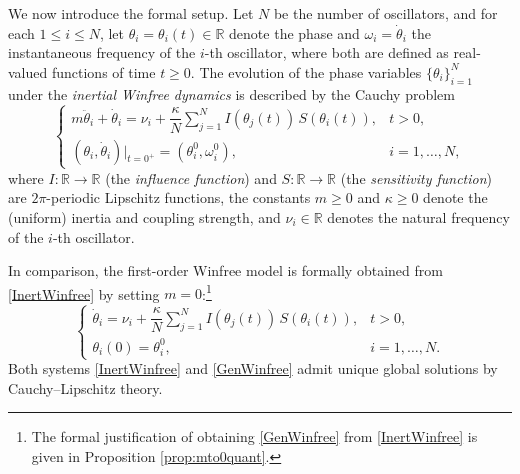 \documentclass[11pt,reqno]{amsart}
\newcommand{\R}{\mathbb{R}}
\theoremstyle{definition}
\theoremstyle{remark}
\begin{document}
We now introduce the formal setup.
Let $N$ be the number of oscillators, and for each $1\le i\le N$, let
$\theta_i=\theta_i(t)\in\R$ denote the phase and $\omega_i=\dot\theta_i$
the instantaneous frequency of the $i$-th oscillator, where both are defined as real-valued functions of time $t\ge 0$. The evolution of the phase variables $\{\theta_i\}_{i=1}^N$ under the \emph{inertial
Winfree dynamics} is described by the Cauchy problem
\begin{equation}\label{InertWinfree}
    \begin{cases}
        m\ddot\theta_i + \dot{\theta}_i=\nu_i+\dfrac\kappa N \sum_{j=1}^N I(\theta_j(t))\,S(\theta_i(t)), & t>0, \\[2pt]
        (\theta_i,\dot\theta_i)\big\rvert_{t=0^+} =(\theta_i^0,\omega_i^0), &  i=1,\dots,N,
    \end{cases}
\end{equation}
where $I\colon\R\to\R$ (the \emph{influence function}) and
$S\colon\R\to\R$ (the \emph{sensitivity function}) are $2\pi$-periodic
Lipschitz functions, the constants $m\ge 0$ and $\kappa\ge 0$ denote
the (uniform) inertia and coupling strength, and $\nu_i\in\R$ denotes
the natural frequency of the $i$-th oscillator.

In comparison, the first-order Winfree model is formally obtained from
\eqref{InertWinfree} by setting $m=0$:\footnote{The formal justification of obtaining \eqref{GenWinfree} from \eqref{InertWinfree} is given in Proposition \ref{prop:mto0quant}.}
\begin{equation}\label{GenWinfree}
    \begin{cases}
        \dot{\theta}_i=\nu_i+\dfrac\kappa N \sum_{j=1}^N I(\theta_j(t))\,S(\theta_i(t)), & t>0, \\[2pt]
        \theta_i(0)=\theta_i^0, &  i=1,\dots,N.
    \end{cases}
\end{equation}
Both systems \eqref{InertWinfree} and \eqref{GenWinfree} admit unique
global solutions by Cauchy--Lipschitz theory.
\end{document}
